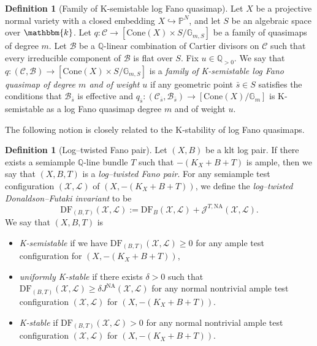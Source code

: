 \documentclass[12pt,twoside]{amsart}
\theoremstyle{definition}
\newtheorem{defn}[thm]{Definition}
\begin{document}
\begin{defn}[Family of K-semistable log Fano quasimap]
Let $X$ be a projective normal variety with a closed embedding $X \hookrightarrow \mathbb{P}^N$, and let $S$ be an algebraic space over $\mathbbm{k}$. 
    Let $q\colon \mathcal{C}\to [\mathrm{Cone}(X)\times S/\mathbb{G}_{m,S}]$ be a family of quasimaps of degree $m$.
    Let $\mathcal{B}$ be a $\mathbb{Q}$-linear combination of Cartier divisors on $\mathcal{C}$ such that every irreducible component of $\mathcal{B}$ is flat over $S$.
    Fix $u\in\mathbb{Q}_{>0}$. 
    We say that $q\colon (\mathcal{C},\mathcal{B})\to[\mathrm{Cone}(X)\times S/\mathbb{G}_{m,S}]$ is a {\it family of K-semistable log Fano quasimap of degree $m$ and of weight $u$} if any geometric point $\bar{s}\in S$ satisfies the conditions that $\mathcal{B}_{\bar{s}}$ is effective and $q_{\bar{s}}\colon (\mathcal{C}_{\bar{s}},\mathcal{B}_{\bar{s}})\to [\mathrm{Cone}(X)/\mathbb{G}_{m}]$ is K-semistable as a log Fano quasimap degree $m$ and of weight $u$. 
\end{defn}

The following notion is closely related to the K-stability of log Fano quasimaps.

\begin{defn}[Log--twisted Fano pair]
    Let $(X,B)$ be a klt log pair. If there exists a semiample $\mathbb{Q}$-line bundle $T$ such that $-(K_X+B+T)$ is ample, then we say that $(X,B,T)$ is a {\it log--twisted Fano pair}.
    For any semiample test configuration $(\mathcal{X},\mathcal{L})$ of $(X,-(K_X+B+T))$, we define the {\it log--twisted Donaldson--Futaki invariant} to be
    \[
    \mathrm{DF}_{(B,T)}(\mathcal{X},\mathcal{L}):=\mathrm{DF}_{B}(\mathcal{X},\mathcal{L})+\mathcal{J}^{T,\mathrm{NA}}(\mathcal{X},\mathcal{L}).
    \]
    We say that $(X,B,T)$ is
\begin{itemize}
    \item {\it K-semistable} if we have $\mathrm{DF}_{(B,T)}(\mathcal{X},\mathcal{L})\ge0$ for any ample test configuration for $(X,-(K_X+B+T))$,
    \item {\it uniformly K-stable} if there exists $\delta>0$ such that $\mathrm{DF}_{(B,T)}(\mathcal{X},\mathcal{L})\ge\delta J^{\mathrm{NA}}(\mathcal{X},\mathcal{L})$ for any normal nontrivial ample test configuration $(\mathcal{X},\mathcal{L})$ for $(X,-(K_X+B+T))$.
    \item {\it K-stable} if $\mathrm{DF}_{(B,T)}(\mathcal{X},\mathcal{L})>0$ for any normal nontrivial ample test configuration $(\mathcal{X},\mathcal{L})$ for $(X,-(K_X+B+T))$.
\end{itemize}
\end{defn}
\end{document}
